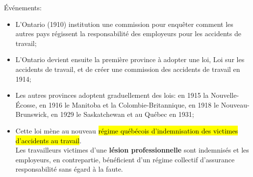 \documentclass[10pt, french]{article}
\begin{document}
\begin{multicols*}{3}
Événements:
\begin{itemize}[leftmargin = *]
	\item	L'Ontario (1910) institution une commission pour enquêter comment les autres pays régissent la responsabilité des employeurs pour les accidents de travail;
	\item	L'Ontario devient ensuite la première province à adopter une loi, Loi sur les accidents de travail, et de créer une commission des accidents de travail en 1914;
	\item	Les autres provinces adoptent graduellement des lois: en 1915 la Nouvelle-Écosse, en 1916 le Manitoba et la Colombie-Britannique, en 1918 le Nouveau-Brunswick, en 1929 le Saskatchewan et au Québec en 1931;
	\item	Cette loi mène au nouveau \hl{régime québécois d'indemnisation des victimes d'accidents au travail}.	\\
			Les travailleurs victimes d'une \textbf{lésion professionnelle} sont indemnisés et les employeurs, en contrepartie, bénéficient d'un régime collectif d'assurance responsabilité sans égard à la faute.
\end{itemize}


\end{multicols*}
\end{document}
